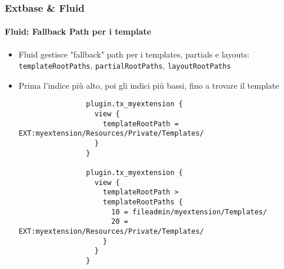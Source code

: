 \begin{frame}[fragile]
	\frametitle{Extbase \& Fluid}
	\framesubtitle{Fluid: Fallback Path per i template}

	\lstset{
		basicstyle=\tiny\ttfamily
	}

	\begin{itemize}
		\item Fluid gestisce "fallback" path per i templates, partials e layouts:\newline
			\smaller\texttt{templateRootPaths}, \texttt{partialRootPaths}, \texttt{layoutRootPaths}\normalsize
		\item Prima l'indice più alto, poi gli indici più bassi, fino a trovare il template

			\begin{lstlisting}
				plugin.tx_myextension {
				  view {
				    templateRootPath = EXT:myextension/Resources/Private/Templates/
				  }
				}

				plugin.tx_myextension {
				  view {
				    templateRootPath >
				    templateRootPaths {
				      10 = fileadmin/myextension/Templates/
				      20 = EXT:myextension/Resources/Private/Templates/
				    }
				  }
				}
			\end{lstlisting}

	\end{itemize}

\end{frame}



